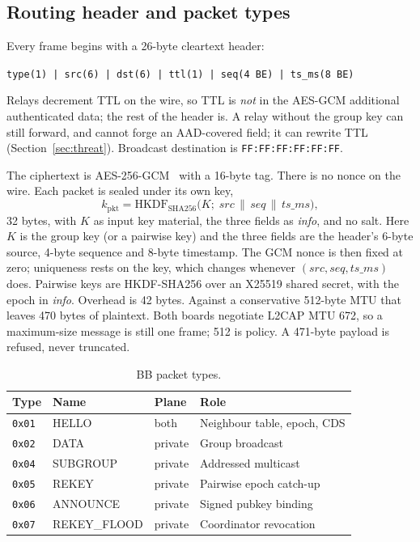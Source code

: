 \documentclass[conference,10pt]{IEEEtran}
\begin{document}
\subsection{Routing header and packet types}

Every frame begins with a 26-byte cleartext header:
\begin{center}
\texttt{type(1) | src(6) | dst(6) | ttl(1) | seq(4 BE) | ts\_ms(8 BE)}
\end{center}
Relays decrement TTL on the wire, so TTL is \emph{not} in the AES-GCM
additional authenticated data; the rest of the header is. A relay without
the group key can still forward, and cannot forge an AAD-covered field; it
can rewrite TTL (Section~\ref{sec:threat}).
Broadcast destination is \texttt{FF:FF:FF:FF:FF:FF}.

The ciphertext is AES-256-GCM~\cite{nist-gcm,rijndael} with a 16-byte
tag. There is no nonce on the wire. Each packet is sealed under its own
key,
\[
k_{\mathrm{pkt}} = \mathrm{HKDF}_{\mathrm{SHA256}}\bigl(K;\;
\mathit{src}\,\|\,\mathit{seq}\,\|\,\mathit{ts\_ms}\bigr),
\]
32 bytes, with $K$ as input key material, the three fields as
\emph{info}, and no salt. Here $K$ is the group key (or a pairwise key) and the three
fields are the header's 6-byte source, 4-byte sequence and 8-byte
timestamp. The GCM nonce is then fixed at zero; uniqueness rests on the
key, which changes whenever $(\mathit{src},\mathit{seq},\mathit{ts\_ms})$
does. Pairwise keys are HKDF-SHA256 over an X25519 shared secret, with the
epoch in \emph{info}. Overhead is
42 bytes. Against a conservative 512-byte MTU that leaves 470 bytes of
plaintext. Both boards negotiate L2CAP MTU 672, so a maximum-size
message is still one frame; 512 is policy. A 471-byte payload is refused,
never truncated.

\begin{table}[t]
\centering
\caption{BB packet types.}
\label{tab:pkts}
\begin{tabular}{@{}llll@{}}
\toprule
Type & Name & Plane & Role \\
\midrule
\texttt{0x01} & HELLO & both & Neighbour table, epoch, CDS \\
\texttt{0x02} & DATA & private & Group broadcast \\
\texttt{0x04} & SUBGROUP & private & Addressed multicast \\
\texttt{0x05} & REKEY & private & Pairwise epoch catch-up \\
\texttt{0x06} & ANNOUNCE & private & Signed pubkey binding \\
\texttt{0x07} & REKEY\_FLOOD & private & Coordinator revocation \\
\bottomrule
\end{tabular}
\end{table}
\end{document}
